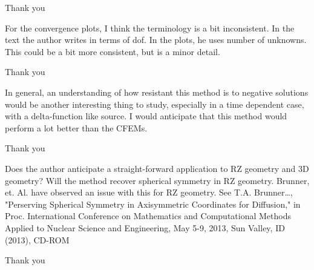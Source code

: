 \documentclass{article}
\begin{document}
Thank you
\bigskip


{
\color{blue}
For the convergence plots, I think the terminology is a bit inconsistent. In the text the author writes
in terms of dof. In the plots, he uses number of unknowns. This could be a bit more consistent, but is a
minor detail.
}


Thank you
\bigskip


{
\color{blue}
In general, an understanding of how resistant this method is to negative solutions would be another
interesting thing to study, especially in a time dependent case, with a delta-function like source. I would
anticipate that this method would perform a lot better than the CFEMs.
}


Thank you
\bigskip



{
\color{blue}
Does the author anticipate a straight-forward application to RZ geometry and 3D geometry? Will the
method recover spherical symmetry in RZ geometry. Brunner, et. Al. have observed an issue with this for RZ
geometry. See T.A. Brunner…, "Perserving Spherical Symmetry in Axisymmetric Coordinates for Diffusion,"
in Proc. International Conference on Mathematics and Computational Methods Applied to Nuclear Science and
Engineering, May 5-9, 2013, Sun Valley, ID (2013), CD-ROM
}


Thank you
\bigskip
\end{document}
